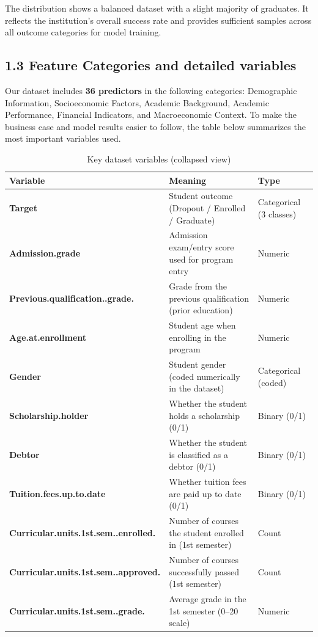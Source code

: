 \documentclass[
]{article}
\begin{document}
The distribution shows a balanced dataset with a slight majority of
graduates. It reflects the institution's overall success rate and
provides sufficient samples across all outcome categories for model
training.

\subsection{1.3 Feature Categories and detailed
variables}\label{feature-categories-and-detailed-variables}

Our dataset includes \textbf{36 predictors} in the following categories:
Demographic Information, Socioeconomic Factors, Academic Background,
Academic Performance, Financial Indicators, and Macroeconomic Context.
To make the business case and model results easier to follow, the table
below summarizes the most important variables used.

\begingroup\fontsize{10}{12}\selectfont

\begin{longtable}[t]{>{\raggedright\arraybackslash}p{12em}>{\raggedright\arraybackslash}p{18em}>{\raggedright\arraybackslash}p{10em}}
\caption{\label{tab:variable-overview-table}Key dataset variables (collapsed view)}\\
\toprule
Variable & Meaning & Type\\
\midrule
\textbf{Target} & Student outcome (Dropout / Enrolled / Graduate) & Categorical (3 classes)\\
\textbf{Admission.grade} & Admission exam/entry score used for program entry & Numeric\\
\textbf{Previous.qualification..grade.} & Grade from the previous qualification (prior education) & Numeric\\
\textbf{Age.at.enrollment} & Student age when enrolling in the program & Numeric\\
\textbf{Gender} & Student gender (coded numerically in the dataset) & Categorical (coded)\\
\addlinespace
\textbf{Scholarship.holder} & Whether the student holds a scholarship (0/1) & Binary (0/1)\\
\textbf{Debtor} & Whether the student is classified as a debtor (0/1) & Binary (0/1)\\
\textbf{Tuition.fees.up.to.date} & Whether tuition fees are paid up to date (0/1) & Binary (0/1)\\
\textbf{Curricular.units.1st.sem..enrolled.} & Number of courses the student enrolled in (1st semester) & Count\\
\textbf{Curricular.units.1st.sem..approved.} & Number of courses successfully passed (1st semester) & Count\\
\addlinespace
\textbf{Curricular.units.1st.sem..grade.} & Average grade in the 1st semester (0–20 scale) & Numeric\\
\bottomrule
\end{longtable}
\endgroup{}
\end{document}
